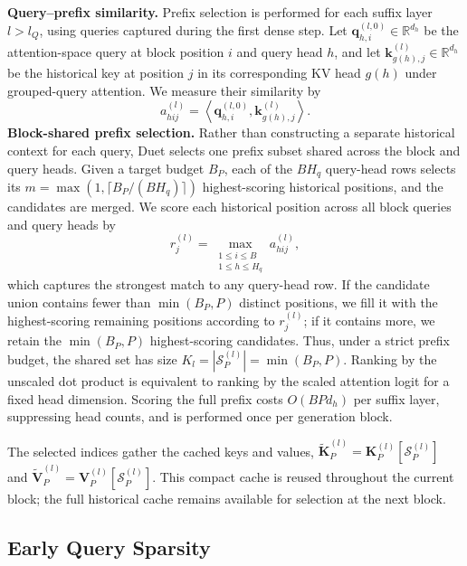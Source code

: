 \textbf{Query--prefix similarity.}
Prefix selection is performed for each suffix layer $l>l_Q$, using queries captured during the first dense step. Let $\mathbf{q}_{h,i}^{(l,0)}\in\mathbb{R}^{d_h}$ be the attention-space query at block position $i$ and query head $h$, and let $\mathbf{k}_{g(h),j}^{(l)}\in\mathbb{R}^{d_h}$ be the historical key at position $j$ in its corresponding KV head $g(h)$ under grouped-query attention. We measure their similarity by
\begin{equation}
    a_{hij}^{(l)}
    =
    \left\langle
        \mathbf{q}_{h,i}^{(l,0)},
        \mathbf{k}_{g(h),j}^{(l)}
    \right\rangle .
    \label{eq:prefix_similarity}
\end{equation}
\textbf{Block-shared prefix selection.} Rather than constructing a separate historical context for each query, Duet selects one prefix subset shared across the block and query heads. Given a target budget $B_P$, each of the $BH_q$ query-head rows selects its $m=\max(1,\lceil B_P/(BH_q)\rceil)$ highest-scoring historical positions, and the candidates are merged. We score each historical position across all block queries and query heads by
\begin{equation}
    r_j^{(l)}
    =
    \max_{\substack{1\leq i\leq B\\1\leq h\leq H_q}}
    a_{hij}^{(l)},
    \label{eq:prefix_aggregate_score}
\end{equation}
which captures the strongest match to any query-head row. If the candidate union contains fewer than $\min(B_P,P)$ distinct positions, we fill it with the highest-scoring remaining positions according to $r_j^{(l)}$; if it contains more, we retain the $\min(B_P,P)$ highest-scoring candidates. Thus, under a strict prefix budget, the shared set has size $K_l=|\mathcal{S}_P^{(l)}|=\min(B_P,P)$. Ranking by the unscaled dot product is equivalent to ranking by the scaled attention logit for a fixed head dimension. Scoring the full prefix costs $O(BP d_h)$ per suffix layer, suppressing head counts, and is performed once per generation block.

The selected indices gather the cached keys and values, $\widetilde{\mathbf{K}}_{P}^{(l)}=\mathbf{K}_{P}^{(l)}[\mathcal{S}_{P}^{(l)}]$ and $\widetilde{\mathbf{V}}_{P}^{(l)}=\mathbf{V}_{P}^{(l)}[\mathcal{S}_{P}^{(l)}]$. This compact cache is reused throughout the current block; the full historical cache remains available for selection at the next block.


\subsection{Early Query Sparsity}
\label{sec:method_query}

